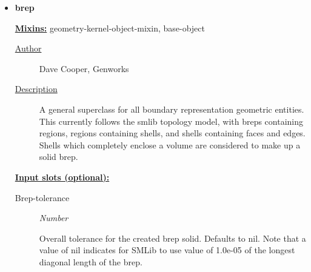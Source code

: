 \documentclass [11pt]{book}
\begin{document}
\begin{itemize}







\item {}
\label{prim:brep}
\textbf{brep}


\textbf{
\underline{Mixins:}} geometry-kernel-object-mixin, base-object





\begin{description}

\item [
\underline{Author}]


Dave Cooper, Genworks



\item [
\underline{Description}]


A general superclass for all boundary representation geometric entities. 
This currently follows the smlib topology model, with breps containing regions, regions containing shells, 
and shells containing faces and edges. Shells which completely enclose a volume are considered 
to make up a solid brep.



\end{description}








\textbf{
\underline{Input slots (optional):}}

\begin{description}

\item [Brep-tolerance]
\emph{Number}

 Overall tolerance for the created brep solid. Defaults to nil.
Note that a value of nil indicates for SMLib to use value of 1.0e-05 of the
longest diagonal length of the brep.





\end{description}
\end{itemize}
\end{document}
